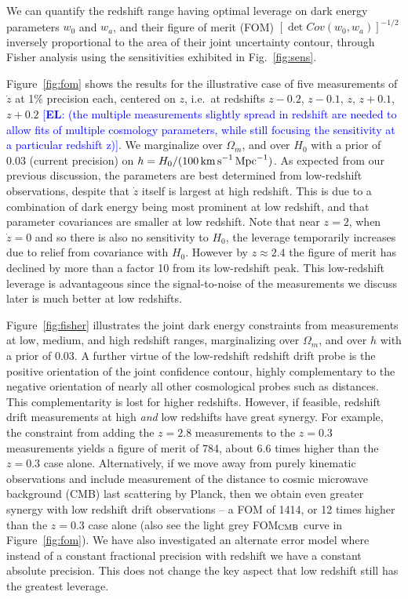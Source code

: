 \documentclass[preprint2, 10pt]{aastex}
\newcommand{\eric}[1]{\textcolor{blue}{[{\bf EL}: #1]}}
\newcommand{\om}{\Omega_m}
\begin{document}
We can quantify the redshift range having optimal leverage on dark energy 
parameters $w_0$ and $w_a$, and their figure of merit (FOM) 
$[\det Cov(w_0,w_a)]^{-1/2}$ inversely proportional to the area of their joint 
uncertainty contour, through Fisher analysis using the sensitivities 
exhibited in Fig.~\ref{fig:sens}. 

Figure~\ref{fig:fom} shows the results for the illustrative case of 
five measurements of $\dot z$ at 1\% precision each, centered on $z$, 
i.e.\ at redshifts $z-0.2$, $z-0.1$, $z$, $z+0.1$, $z+0.2$ 
\eric{(the multiple measurements slightly spread 
in redshift are needed to allow fits of multiple cosmology parameters, 
while still focusing the sensitivity at a particular redshift z)}. We marginalize 
over $\om$, and over $H_0$ with a 
prior of $0.03$ (current precision) on 
$h=H_0/(100\,{\rm km\,s}^{-1}\,{\rm Mpc}^{-1})$. As expected from our previous discussion, 
the parameters are best determined from low-redshift observations, despite 
that $\dot z$ itself is largest at high redshift. This is due to a 
combination of dark energy being most prominent at low redshift, and 
that parameter covariances are smaller at low redshift. Note that near 
$z=2$, when $\dot z=0$ and so there is also no sensitivity to $H_0$, 
the leverage temporarily increases due to relief from covariance with 
$H_0$. However by $z\approx2.4$ the figure of merit has declined by more 
than a factor 10 from its low-redshift peak. This low-redshift leverage is 
advantageous since the signal-to-noise of the measurements we discuss later 
is much better at low redshifts. 

Figure~\ref{fig:fisher} illustrates the joint dark energy constraints 
from measurements at low, medium, and high redshift ranges, 
marginalizing over $\om$, and over $h$ with a prior of $0.03$. 
A further virtue 
of the low-redshift redshift drift probe is the positive orientation of 
the joint confidence contour, highly complementary to the negative orientation 
of nearly all other cosmological probes such as distances. This 
complementarity is lost for higher redshifts. However, if feasible, redshift 
drift measurements at high {\it and\/} low redshifts have great synergy. 
For example, the constraint from adding the $z=2.8$ measurements to the 
$z=0.3$ measurements yields a figure of merit of 784, about 6.6 times 
higher than the $z=0.3$ case alone. Alternatively, if we move away from 
purely kinematic observations and include measurement of the distance to 
cosmic microwave background (CMB) last scattering by Planck, then we obtain 
even greater synergy with low redshift drift observations -- a FOM of 1414, 
or 12 times higher than the $z=0.3$ case alone (also see the light grey 
FOM$_{\rm CMB}$ curve in Figure~\ref{fig:fom}). 
We have also investigated an alternate error model where 
instead of a constant fractional precision with redshift we have a constant 
absolute precision. This does not change the key aspect that low 
redshift still has the greatest leverage. 
\end{document}
